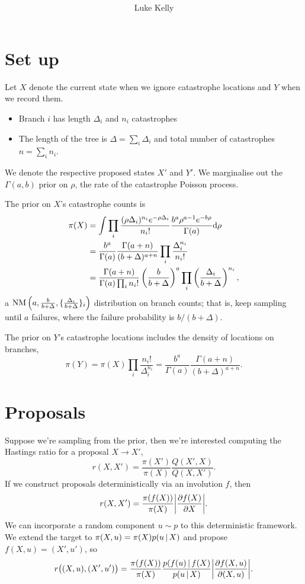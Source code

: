 \documentclass[11pt,a4paper]{article}
\title{\vspace{-2.5cm} }
\author{Luke Kelly}
\newcommand{\Xp}{{X'}}
\newcommand{\pX}{\pi(X)}
\newcommand{\pXp}{\pi(\Xp)}
\newcommand{\Yp}{{Y'}}
\newcommand{\pY}{\pi(Y)}
\renewcommand{\ni}{n_i}
\newcommand{\Di}{\Delta_i}
\begin{document}
\maketitle

\section{Set up}

Let $ X $ denote the current state when we ignore catastrophe locations and $ Y $ when we record them.
\begin{itemize}
    \item Branch $ i $ has length $ \Di $ and $ \ni $ catastrophes
    \item The length of the tree is $ \Delta = \sum_i \Di $ and total number of catastrophes $ n = \sum_i \ni $.
\end{itemize}
We denote the respective proposed states $ \Xp $ and $ \Yp $. We marginalise out the $ \Gamma(a, b) $ prior on $ \rho $, the  rate of the catastrophe Poisson process.

The prior on $ X $'s catastrophe counts is
\begin{align*}
    \pX
        &= \int \prod_i \frac{(\rho \Di)^{\ni} e^{-\rho \Di}}{\ni!} \frac{b^{a} \rho^{a - 1} e^{-b \rho}}{\Gamma(a)} \ud \rho \\
        &= \frac{b^a}{\Gamma(a)} \frac{\Gamma(a + n)}{(b + \Delta)^{a + n}} \prod_i \frac{\Di^{\ni}}{\ni !} \\
        &= \frac{\Gamma(a + n)}{\Gamma(a) \prod_i \ni!} \left(\frac{b}{b + \Delta}\right)^{a} \prod_i \left(\frac{\Di}{b + \Delta}\right)^{\ni},
\end{align*}
a $ \NM{a}{\frac{b}{b + \Delta}, \{\frac{\Di}{b + \Delta}\}_i} $ distribution on branch counts; that is, keep sampling until $ a $ failures, where the failure probability is $ b / (b + \Delta) $.

The prior on $ Y $'s catastrophe locations includes the density of locations on branches,
\[
    \pY = \pX \prod_i \frac{\ni!}{\Di^{\ni}} = \frac{b^a}{\Gamma(a)} \frac{\Gamma(a + n)}{(b + \Delta)^{a + n}}.
\]

\section{Proposals}

Suppose we're sampling from the prior, then we're interested computing the Hastings ratio for a proposal $ X \rightarrow X' $,
\[
    r(X, X') = \frac{\pXp}{\pX} \frac{Q(\Xp, X)}{Q(X, \Xp)}.
\]
If we construct proposals deterministically via an involution $ f $, then
\[
    r(X, X')
        = \frac{\pi(f(X))}{\pX} \abs*{\frac{\pd f(X)}{\pd X}}.
\]
We can incorporate a random component $ u \sim p $ to this deterministic framework. We extend the target to $ \pi(X, u) = \pi(X) p(u \operatorname*{\mid} X) $ and propose $ f(X, u) = (X', u') $, so
\[
    r\big((X, u), (X', u')\big)
        = \frac{\pi(f(X))}{\pi(X)} \frac{p(f(u) \given f(X)}{p(u \given X)} \abs*{\frac{\pd f(X, u)}{\pd (X, u)}}.
\]
\end{document}
